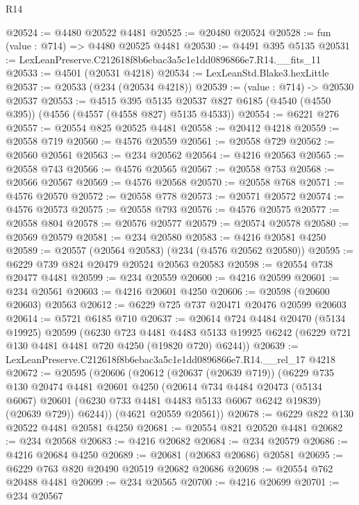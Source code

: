 \begin{lexlean}{R14}
\begin{coremodule}
@20524 := @4480 @20522 @4481
@20525 := @20480 @20524
@20528 := fun (value : @714) => @4480 @20525 @4481
@20530 := @4491 @395 @5135
@20531 := LexLeanPreserve.C212618f8b6ebac3a5c1e1dd0896866e7.R14.__fits_11
@20533 := @4501 (@20531 @4218)
@20534 := LexLeanStd.Blake3.hexLittle
@20537 := @20533 (@234 (@20534 @4218))
@20539 := (value : @714) -> @20530 @20537
@20553 := @4515
    @395
    @5135
    @20537
    @827
    @6185
    (@4540 (@4550 @395))
    (@4556 (@4557 (@4558 @827) @5135 @4533))
@20554 := @6221 @276
@20557 := @20554 @825 @20525 @4481
@20558 := @20412 @4218
@20559 := @20558 @719
@20560 := @4576 @20559
@20561 := @20558 @729
@20562 := @20560 @20561
@20563 := @234 @20562
@20564 := @4216 @20563
@20565 := @20558 @743
@20566 := @4576 @20565
@20567 := @20558 @753
@20568 := @20566 @20567
@20569 := @4576 @20568
@20570 := @20558 @768
@20571 := @4576 @20570
@20572 := @20558 @778
@20573 := @20571 @20572
@20574 := @4576 @20573
@20575 := @20558 @793
@20576 := @4576 @20575
@20577 := @20558 @804
@20578 := @20576 @20577
@20579 := @20574 @20578
@20580 := @20569 @20579
@20581 := @234 @20580
@20583 := @4216 @20581 @4250
@20589 := @20557 (@20564 @20583) (@234 (@4576 @20562 @20580))
@20595 := @6229 @739 @824 @20479 @20524 @20563 @20583
@20598 := @20554 @738 @20477 @4481
@20599 := @234 @20559
@20600 := @4216 @20599
@20601 := @234 @20561
@20603 := @4216 @20601 @4250
@20606 := @20598 (@20600 @20603) @20563
@20612 := @6229 @725 @737 @20471 @20476 @20599 @20603
@20614 := @5721 @6185 @710
@20637 := @20614
    @724
    @4484
    @20470
    (@5134 @19925)
    @20599
    (@6230
      @723
      @4481
      @4483
      @5133
      @19925
      @6242
      (@6229 @721 @130 @4481 @4481 @720 @4250 (@19820 @720) @6244))
@20639 := LexLeanPreserve.C212618f8b6ebac3a5c1e1dd0896866e7.R14.__rel_17 @4218
@20672 := @20595
    (@20606
      (@20612
        (@20637 (@20639 @719))
        (@6229
          @735
          @130
          @20474
          @4481
          @20601
          @4250
          (@20614
            @734
            @4484
            @20473
            (@5134 @6067)
            @20601
            (@6230 @733 @4481 @4483 @5133 @6067 @6242 @19839)
            (@20639 @729))
          @6244))
      (@4621 @20559 @20561))
@20678 := @6229 @822 @130 @20522 @4481 @20581 @4250
@20681 := @20554 @821 @20520 @4481
@20682 := @234 @20568
@20683 := @4216 @20682
@20684 := @234 @20579
@20686 := @4216 @20684 @4250
@20689 := @20681 (@20683 @20686) @20581
@20695 := @6229 @763 @820 @20490 @20519 @20682 @20686
@20698 := @20554 @762 @20488 @4481
@20699 := @234 @20565
@20700 := @4216 @20699
@20701 := @234 @20567

\end{coremodule}
\end{lexlean}
